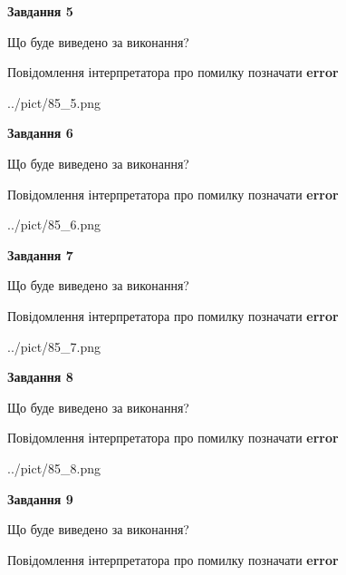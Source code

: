 \documentclass[11pt, ukrainian]{article}
\begin{document}
{\begin {large}
{\begin {center}\textbf{Завдання 5}\end {center}}\par
Що буде виведено за виконання? \par
Повідомлення інтерпретатора про помилку позначати \textbf{error}

\begin{center}
	{../pict/85_5.png}
\end{center}
\newpage

{\begin {center}\textbf{Завдання 6}\end {center}}\par
Що буде виведено за виконання? \par
Повідомлення інтерпретатора про помилку позначати \textbf{error}

\begin{center}
	{../pict/85_6.png}
\end{center}
\newpage

{\begin {center}\textbf{Завдання 7}\end {center}}\par
Що буде виведено за виконання? \par
Повідомлення інтерпретатора про помилку позначати \textbf{error}

\begin{center}
	{../pict/85_7.png}
\end{center}
\newpage

{\begin {center}\textbf{Завдання 8}\end {center}}\par
Що буде виведено за виконання? \par
Повідомлення інтерпретатора про помилку позначати \textbf{error}

\begin{center}
	{../pict/85_8.png}
\end{center}
\newpage

{\begin {center}\textbf{Завдання 9}\end {center}}\par
Що буде виведено за виконання? \par
Повідомлення інтерпретатора про помилку позначати \textbf{error}


\end{large}}
\end{document}
